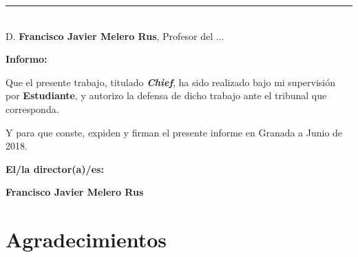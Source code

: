 \thispagestyle{empty}

\noindent\rule[-1ex]{\textwidth}{2pt}\\[4.5ex]

D. \textbf{Francisco Javier Melero Rus}, Profesor del ...

\vspace{0.5cm}

\textbf{Informo:}

\vspace{0.5cm}

Que el presente trabajo, titulado \textit{\textbf{Chief}},
ha sido realizado bajo mi supervisión por \textbf{Estudiante}, y autorizo la defensa de dicho trabajo ante el tribunal
que corresponda.

\vspace{0.5cm}

Y para que conste, expiden y firman el presente informe en Granada a Junio de 2018.

\vspace{1cm}

\textbf{El/la director(a)/es: }

\vspace{5cm}

\noindent \textbf{Francisco Javier Melero Rus}

\chapter*{Agradecimientos}





